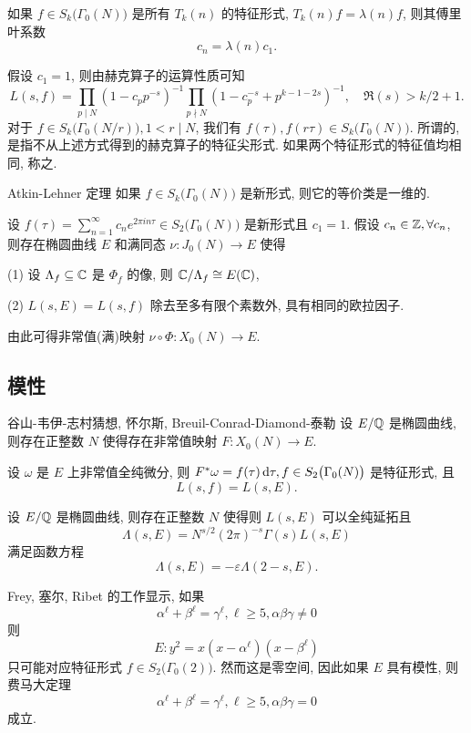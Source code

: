\begin{proposition}{}{}
如果 $f\in S_k\bigl(\Gamma_0(N)\bigr)$ 是所有 $T_k(n)$ 的特征形式, $T_k(n)f=\lambda(n)f$, 则其傅里叶系数
  \[c_n=\lambda(n)c_1.\]
\end{proposition}
假设 $c_1=1$, 则由赫克算子的运算性质可知
  \[L(s,f)=\prod_{p\mid N} (1-c_pp^{-s})^{-1}\prod_{p\nmid N}(1-c_p^{-s}+p^{k-1-2s})^{-1},\quad \Re(s)>k/2+1.\]
对于 $f\in S_k\bigl(\Gamma_0(N/r)\bigr),1<r\mid N$, 我们有 $f(\tau),f(r\tau) \in S_k\bigl(\Gamma_0(N)\bigr)$. 
所谓的, 是指不从上述方式得到的赫克算子的特征尖形式. 如果两个特征形式的特征值均相同, 称之.

\begin{theorem}{Atkin-Lehner 定理}{}
如果 $f\in S_k\bigl(\Gamma_0(N)\bigr)$ 是新形式, 则它的等价类是一维的.
\end{theorem}

\begin{theorem}{}{}
设 $f(\tau)=\sum_{n=1}^\infty c_ne^{2\pi in\tau}\in S_2\bigl(\Gamma_0(N)\bigr)$ 是新形式且 $c_1=1$. 假设 $c_n\in{\mathbb{Z}},\forall c_n$, 则存在椭圆曲线 $E$ 和满同态 $\nu:J_0(N)\to E$ 使得

(1) 设 $\Lambda_f\subseteq{\mathbb{C}}$ 是 $\Phi_f$ 的像, 则 ${\mathbb{C}}/\Lambda_f\cong E({\mathbb{C}})$,

(2) $L(s,E)=L(s,f)$ 除去至多有限个素数外, 具有相同的欧拉因子.
\end{theorem}

由此可得非常值(满)映射 $\nu\circ\Phi:X_0(N)\to E$.

\subsection{模性}

\begin{theorem}{谷山-韦伊-志村猜想, 怀尔斯, Breuil-Conrad-Diamond-泰勒}{}
设 $E/{\mathbb{Q}}$ 是椭圆曲线, 则存在正整数 $N$ 使得存在非常值映射 $F:X_0(N)\to E$.
\end{theorem}

设 $\omega$ 是 $E$ 上非常值全纯微分, 则 $F^*\omega=f(\tau)\mathop{}\!\mathrm{d} \tau, f\in S_2\bigl(\Gamma_0(N)\bigr)$ 是特征形式, 且
  \[L(s,f)=L(s,E).\]

\begin{theorem}{}{}
设 $E/{\mathbb{Q}}$ 是椭圆曲线, 则存在正整数 $N$ 使得则 $L(s,E)$ 可以全纯延拓且
  \[\Lambda(s,E)=N^{s/2}(2\pi)^{-s}\Gamma(s)L(s,E)\]
满足函数方程
  \[\Lambda(s,E)=-\varepsilon\Lambda(2-s,E).\]
\end{theorem}

Frey, 塞尔, Ribet 的工作显示, 如果
  \[\alpha^\ell+\beta^\ell=\gamma^\ell,\ell\ge 5,\alpha\beta\gamma\neq 0\]
则
  \[E:y^2=x(x-\alpha^\ell)(x-\beta^\ell)\]
只可能对应特征形式 $f\in S_2\bigl(\Gamma_0(2)\bigr)$. 然而这是零空间, 因此如果 $E$ 具有模性, 则费马大定理
  \[\alpha^\ell+\beta^\ell=\gamma^\ell,\ell\ge 5,\alpha\beta\gamma=0\]
成立.


